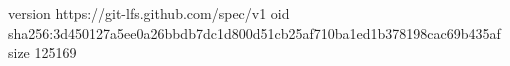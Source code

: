 version https://git-lfs.github.com/spec/v1
oid sha256:3d450127a5ee0a26bbdb7dc1d800d51cb25af710ba1ed1b378198cac69b435af
size 125169
